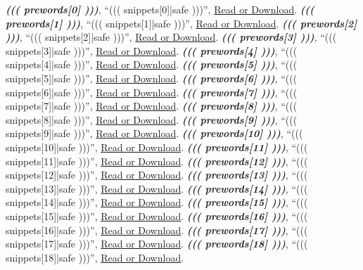 \documentclass{article}
\begin{document}
\begin{thebibliography}{99}

\emph{\textbf{((( prewords[0] )))}}, ``{((( snippets[0]|safe )))}'', \href{((( lander[0] ))) }{Read or Download}.
\emph{\textbf{((( prewords[1] )))}}, ``{((( snippets[1]|safe )))}'', \href{((( lander[1] )))}{Read or Download}.
\emph{\textbf{((( prewords[2] )))}}, ``{((( snippets[2]|safe )))}'', \href{((( lander[2] )))}{Read or Download}.
\emph{\textbf{((( prewords[3] )))}}, ``{((( snippets[3]|safe )))}'', \href{((( lander[3] )))}{Read or Download}.
\emph{\textbf{((( prewords[4] )))}}, ``{((( snippets[4]|safe )))}'', \href{((( lander[4] )))}{Read or Download}.
\emph{\textbf{((( prewords[5] )))}}, ``{((( snippets[5]|safe )))}'', \href{((( lander[5] )))}{Read or Download}.
\emph{\textbf{((( prewords[6] )))}}, ``{((( snippets[6]|safe )))}'', \href{((( lander[6] )))}{Read or Download}.
\emph{\textbf{((( prewords[7] )))}}, ``{((( snippets[7]|safe )))}'', \href{((( lander[7] )))}{Read or Download}.
\emph{\textbf{((( prewords[8] )))}}, ``{((( snippets[8]|safe )))}'', \href{((( lander[8] )))}{Read or Download}.
\emph{\textbf{((( prewords[9] )))}}, ``{((( snippets[9]|safe )))}'', \href{((( lander[9] )))}{Read or Download}.
\emph{\textbf{((( prewords[10] )))}}, ``{((( snippets[10]|safe )))}'', \href{((( lander[10] )))}{Read or Download}.
\emph{\textbf{((( prewords[11] )))}}, ``{((( snippets[11]|safe )))}'', \href{((( lander[11] )))}{Read or Download}.
\emph{\textbf{((( prewords[12] )))}}, ``{((( snippets[12]|safe )))}'', \href{((( lander[12] )))}{Read or Download}.
\emph{\textbf{((( prewords[13] )))}}, ``{((( snippets[13]|safe )))}'', \href{((( lander[13] )))}{Read or Download}.
\emph{\textbf{((( prewords[14] )))}}, ``{((( snippets[14]|safe )))}'', \href{((( lander[14] )))}{Read or Download}.
\emph{\textbf{((( prewords[15] )))}}, ``{((( snippets[15]|safe )))}'', \href{((( lander[15] )))}{Read or Download}.
\emph{\textbf{((( prewords[16] )))}}, ``{((( snippets[16]|safe )))}'', \href{((( lander[16] )))}{Read or Download}.
\emph{\textbf{((( prewords[17] )))}}, ``{((( snippets[17]|safe )))}'', \href{((( lander[17] )))}{Read or Download}.
\emph{\textbf{((( prewords[18] )))}}, ``{((( snippets[18]|safe )))}'', \href{((( lander[18] )))}{Read or Download}.

\end{thebibliography}
\end{document}
